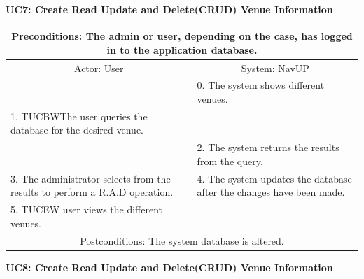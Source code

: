﻿\documentclass{article}
\begin{document}
				\vspace{5mm}
                \begin{flushleft}
                \textbf{UC7: Create Read Update and Delete(CRUD) Venue Information}\\
                \end{flushleft}
        		\centering			
       		 \small
       		 \begin{tabular}{|p{6cm}|p{6cm}|}
       		 \hline
       		 \multicolumn{2}{c}{\parbox{12cm}{\vspace{2mm}Preconditions: The admin or user, depending on the case, has logged in to the application database.\vspace{2mm}}} \\
       		 \hline
       		 \multicolumn{1}{c}{Actor: User} & \multicolumn{1}{c}{ System: NavUP} \\
        		\hline
       		 & 0.	The system shows different venues.\\
       		 \hline
       		 1.	TUCBWThe user queries the database for the desired venue.\\
 				&2.	The system returns the results from the query.\\
        		\hline
       		 3.	The administrator selects from the results to perform a R.A.D operation. & 4.	The system updates the database after the changes have been made.\\
				\hline
					5.	TUCEW user views the different venues.&\\
       		 \hline
        		\multicolumn{2}{c}{Postconditions: The system database is altered.} \\
        		\hline
        \end{tabular}   
        \newpage
				\vspace{5mm}
                \begin{flushleft}
                \textbf{UC8: Create Read Update and Delete(CRUD) Venue Information}\\
                \end{flushleft}
        		\centering		
       		 \small
\end{document}
